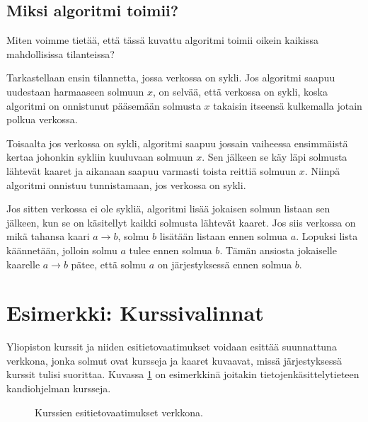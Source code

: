 \subsection{Miksi algoritmi toimii?}

Miten voimme tietää, että tässä kuvattu algoritmi toimii
oikein kaikissa mahdollisissa tilanteissa?

Tarkastellaan ensin tilannetta, jossa verkossa on sykli.
Jos algoritmi saapuu uudestaan harmaaseen solmuun $x$,
on selvää, että verkossa on sykli,
koska algoritmi on onnistunut pääsemään solmusta $x$
takaisin itseensä kulkemalla jotain polkua verkossa.

Toisaalta jos verkossa on sykli, algoritmi saapuu
jossain vaiheessa ensimmäistä kertaa johonkin sykliin
kuuluvaan solmuun $x$. Sen jälkeen se käy läpi solmusta
lähtevät kaaret ja aikanaan saapuu varmasti toista reittiä
solmuun $x$. Niinpä algoritmi onnistuu tunnistamaan,
jos verkossa on sykli.

Jos sitten verkossa ei ole sykliä, algoritmi lisää jokaisen
solmun listaan sen jälkeen, kun se on käsitellyt
kaikki solmusta lähtevät kaaret.
Jos siis verkossa on mikä tahansa kaari $a \rightarrow b$,
solmu $b$ lisätään listaan ennen solmua $a$.
Lopuksi lista käännetään, jolloin solmu $a$
tulee ennen solmua $b$.
Tämän ansiosta jokaiselle kaarelle $a \rightarrow b$ pätee,
että solmu $a$ on järjestyksessä ennen solmua $b$.

\section{Esimerkki: Kurssivalinnat}

Yliopiston kurssit ja niiden esitietovaatimukset voidaan esittää 
suunnattuna verkkona, jonka solmut ovat kursseja ja kaaret kuvaavat,
missä järjestyksessä kurssit tulisi suorittaa.
Kuvassa \ref{fig:kuresi} on esimerkkinä joitakin
tietojenkäsittely\-tieteen kandiohjelman kursseja.

\begin{figure}
\center
\begin{center}
\end{center}
\caption{Kurssien esitietovaatimukset verkkona.}
\label{fig:kuresi}
\end{figure}

